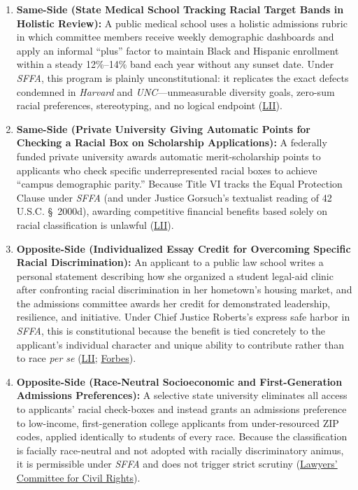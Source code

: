 \documentclass[12pt]{article}
\begin{document}
\begin{enumerate}
\item \textbf{Same-Side (State Medical School Tracking Racial Target Bands in Holistic Review):} A public medical school uses a holistic admissions rubric in which committee members receive weekly demographic dashboards and apply an informal ``plus'' factor to maintain Black and Hispanic enrollment within a steady 12\%--14\% band each year without any sunset date. Under \textit{SFFA}, this program is plainly unconstitutional: it replicates the exact defects condemned in \textit{Harvard} and \textit{UNC}---unmeasurable diversity goals, zero-sum racial preferences, stereotyping, and no logical endpoint (\href{https://www.law.cornell.edu/supremecourt/text/20-1199}{LII}).

\item \textbf{Same-Side (Private University Giving Automatic Points for Checking a Racial Box on Scholarship Applications):} A federally funded private university awards automatic merit-scholarship points to applicants who check specific underrepresented racial boxes to achieve ``campus demographic parity.'' Because Title VI tracks the Equal Protection Clause under \textit{SFFA} (and under Justice Gorsuch's textualist reading of 42 U.S.C. \S~2000d), awarding competitive financial benefits based solely on racial classification is unlawful (\href{https://www.law.cornell.edu/supremecourt/text/20-1199}{LII}).

\item \textbf{Opposite-Side (Individualized Essay Credit for Overcoming Specific Racial Discrimination):} An applicant to a public law school writes a personal statement describing how she organized a student legal-aid clinic after confronting racial discrimination in her hometown's housing market, and the admissions committee awards her credit for demonstrated leadership, resilience, and initiative. Under Chief Justice Roberts's express safe harbor in \textit{SFFA}, this is constitutional because the benefit is tied concretely to the applicant's individual character and unique ability to contribute rather than to race \textit{per se} (\href{https://www.law.cornell.edu/supremecourt/text/20-1199}{LII}; \href{https://www.forbes.com/sites/michaeltnietzel/2023/07/02/three-of-the-bigger-puzzles-in-the-supreme-court-college-admissions-decision/}{Forbes}).

\item \textbf{Opposite-Side (Race-Neutral Socioeconomic and First-Generation Admissions Preferences):} A selective state university eliminates all access to applicants' racial check-boxes and instead grants an admissions preference to low-income, first-generation college applicants from under-resourced ZIP codes, applied identically to students of every race. Because the classification is facially race-neutral and not adopted with racially discriminatory animus, it is permissible under \textit{SFFA} and does not trigger strict scrutiny (\href{https://www.lawyerscommittee.org/wp-content/uploads/2023/10/20220927-LC_QA_Affirmative-Action_FINAL.pdf}{Lawyers' Committee for Civil Rights}).


\end{enumerate}
\end{document}
